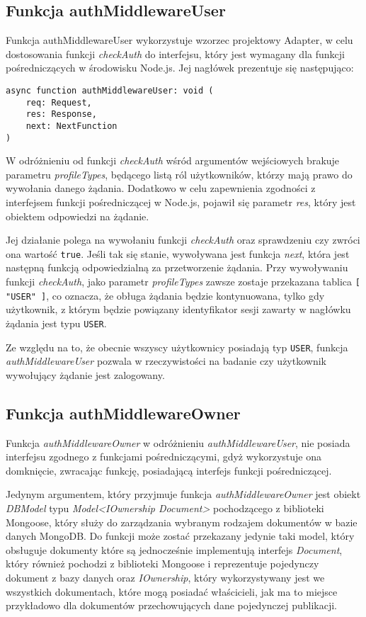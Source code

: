 \documentclass[a4paper,12pt,twoside,openany]{report}
\begin{document}
\subsection{Funkcja authMiddlewareUser}
Funkcja authMiddlewareUser wykorzystuje wzorzec projektowy Adapter, w celu dostosowania funkcji \textit{checkAuth} do interfejsu, który jest wymagany dla funkcji pośredniczących w środowisku Node.js. Jej nagłówek prezentuje się następująco: 
\begin{lstlisting}[caption=Sygnatura funkcji authMiddlewareUser,label=code1,captionpos=b]
async function authMiddlewareUser: void (
	req: Request,
	res: Response,
	next: NextFunction
)
\end{lstlisting}
W odróżnieniu od funkcji \textit{checkAuth} wśród argumentów wejściowych brakuje parametru \textit{profileTypes}, będącego listą ról użytkowników, którzy mają prawo do wywołania danego żądania. Dodatkowo w celu zapewnienia zgodności z interfejsem funkcji pośredniczącej w Node.js, pojawił się parametr \textit{res}, który jest obiektem odpowiedzi na żądanie.   

Jej działanie polega na wywołaniu funkcji \textit{checkAuth} oraz sprawdzeniu czy zwróci ona wartość \verb|true|. Jeśli tak się stanie, wywoływana jest funkcja \textit{next}, która jest następną funkcją odpowiedzialną za przetworzenie żądania.
Przy wywoływaniu funkcji \textit{checkAuth}, jako parametr \textit{profileTypes}  zawsze zostaje przekazana tablica \verb|[ "USER" ]|, co oznacza, że obługa żądania będzie kontynuowana, tylko gdy użytkownik, z którym będzie powiązany identyfikator sesji zawarty w nagłówku żądania jest typu \verb|USER|. 

Ze względu na to, że obecnie wszyscy użytkownicy posiadają typ \verb|USER|, funkcja \textit{authMiddlewareUser} pozwala w rzeczywistości na badanie czy użytkownik wywołujący żądanie jest zalogowany.

\subsection{Funkcja authMiddlewareOwner}
Funkcja \textit{authMiddlewareOwner} w odróżnieniu \textit{authMiddlewareUser}, nie posiada interfejsu zgodnego z funkcjami pośredniczącymi, gdyż wykorzystuje ona domknięcie, zwracając funkcję, posiadającą interfejs funkcji pośredniczącej.


Jedynym argumentem, który przyjmuje funkcja \textit{authMiddlewareOwner} jest obiekt \textit{DBModel} typu \textit{Model<IOwnership  Document>} pochodzącego z biblioteki Mongoose, który służy do zarządzania wybranym rodzajem dokumentów w bazie danych MongoDB. Do funkcji może zostać przekazany jedynie taki model, który obsługuje dokumenty które są jednocześnie implementują interfejs \textit{Document}, który również pochodzi  z biblioteki Mongoose i reprezentuje pojedynczy dokument z bazy danych oraz \textit{IOwnership}, który wykorzystywany jest we wszystkich dokumentach, które mogą posiadać właścicieli, jak ma to miejsce przykładowo dla dokumentów przechowujących dane pojedynczej publikacji. 
\end{document}
